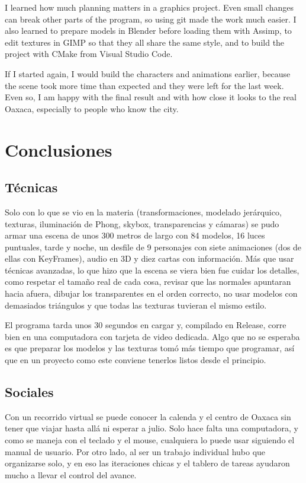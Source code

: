 \documentclass[11pt,a4paper]{article}
\begin{document}
I learned how much planning matters in a graphics project. Even small changes can break other parts of the program, so using git made the work much easier. I also learned to prepare models in Blender before loading them with Assimp, to edit textures in GIMP so that they all share the same style, and to build the project with CMake from Visual Studio Code.

If I started again, I would build the characters and animations earlier, because the scene took more time than expected and they were left for the last week. Even so, I am happy with the final result and with how close it looks to the real Oaxaca, especially to people who know the city.

\clearpage
\section{Conclusiones}

\subsection{Técnicas}

Solo con lo que se vio en la materia (transformaciones, modelado jerárquico, texturas, iluminación de Phong, skybox, transparencias y cámaras) se pudo armar una escena de unos 300 metros de largo con 84 modelos, 16 luces puntuales, tarde y noche, un desfile de 9 personajes con siete animaciones (dos de ellas con KeyFrames), audio en 3D y diez cartas con información. Más que usar técnicas avanzadas, lo que hizo que la escena se viera bien fue cuidar los detalles, como respetar el tamaño real de cada cosa, revisar que las normales apuntaran hacia afuera, dibujar los transparentes en el orden correcto, no usar modelos con demasiados triángulos y que todas las texturas tuvieran el mismo estilo.

El programa tarda unos 30 segundos en cargar y, compilado en Release, corre bien en una computadora con tarjeta de video dedicada. Algo que no se esperaba es que preparar los modelos y las texturas tomó más tiempo que programar, así que en un proyecto como este conviene tenerlos listos desde el principio.

\subsection{Sociales}

Con un recorrido virtual se puede conocer la calenda y el centro de Oaxaca sin tener que viajar hasta allá ni esperar a julio. Solo hace falta una computadora, y como se maneja con el teclado y el mouse, cualquiera lo puede usar siguiendo el manual de usuario. Por otro lado, al ser un trabajo individual hubo que organizarse solo, y en eso las iteraciones chicas y el tablero de tareas ayudaron mucho a llevar el control del avance.
\end{document}
